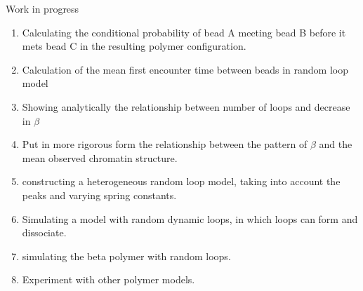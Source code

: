 \documentclass[8pt]{beamer}
\begin{document}
\begin{frame}{Work in progress}
\begin{enumerate}
\item Calculating the conditional probability of bead A meeting bead B before it mets bead C in the resulting polymer configuration. 
\item Calculation of the mean first encounter time between beads in random loop model 
\item Showing analytically the relationship between number of loops and decrease in $\beta$
\item Put in more rigorous form the relationship between the pattern of $\beta$ and the mean observed chromatin structure.
\item constructing a heterogeneous random loop model, taking into account the peaks and varying spring constants.
\item Simulating a model with random dynamic loops, in which loops can form and dissociate.
\item simulating the beta polymer with random loops. 
\item Experiment with other polymer models.
\end{enumerate}
\end{frame}
\end{document}
